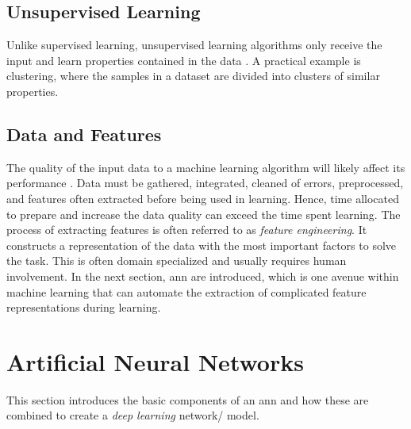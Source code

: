         \subsection{Unsupervised Learning}
            Unlike supervised learning, unsupervised learning algorithms only receive the input and learn properties contained in the data \cite{Goodfellow-et-al-2016}. A practical example is clustering, where the samples in a dataset are divided into clusters of similar properties. 
    
    \subsection{Data and Features}
    The quality of the input data to a machine learning algorithm will likely affect its performance \cite{najafabadi2015deep}. Data must be gathered, integrated, cleaned of errors, preprocessed, and features often extracted before being used in learning. Hence, time allocated to prepare and increase the data quality can exceed the time spent learning. The process of extracting features is often referred to as \textit{feature engineering}. It constructs a representation of the data with the most important factors to solve the task. This is often domain specialized and usually requires human involvement. In the next section, \gls{ann} are introduced, which is one avenue within machine learning that can automate the extraction of complicated feature representations during learning.


\section{Artificial Neural Networks} \label{neural networks}
    This section introduces the basic components of an \gls{ann} and how these are combined to create a \textit{deep learning} network/ model. 

